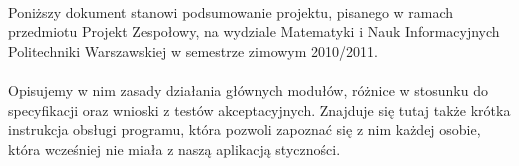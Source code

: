 \paragraph{}
Poniższy dokument stanowi podsumowanie projektu, pisanego w ramach przedmiotu Projekt Zespołowy, na wydziale Matematyki i Nauk Informacyjnych Politechniki Warszawskiej w semestrze zimowym 2010/2011.

\paragraph{}
Opisujemy w nim zasady działania głównych modułów, różnice w stosunku do specyfikacji oraz wnioski z testów akceptacyjnych. Znajduje się tutaj także krótka instrukcja obsługi programu, która pozwoli zapoznać się z nim każdej osobie, która wcześniej nie miała z naszą aplikacją styczności.
